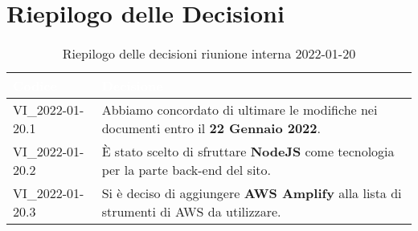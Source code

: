 \section{Riepilogo delle Decisioni}


\begin{table}[!htbp]
\renewcommand{\arraystretch}{1.5}
\begin{tabular}{m{}<{\centering}  m{}<{\centering}}
\rowcolor{darkblue} \textcolor{white}{\textbf{Codice}} & \textcolor{white}{\textbf{Decisione}} \\
\hline
VI\_2022-01-20.1 & Abbiamo concordato di ultimare le modifiche nei documenti entro il \textbf{22 Gennaio 2022}.\\
\rowcolor{gray!10} VI\_2022-01-20.2 & È stato scelto di sfruttare \textbf{NodeJS} come tecnologia per la parte back-end del sito.\\
VI\_2022-01-20.3 & Si è deciso di aggiungere \textbf{AWS Amplify} alla lista di strumenti di AWS da utilizzare.\\
\end{tabular}
\caption{Riepilogo delle decisioni riunione interna 2022-01-20}
\end{table}